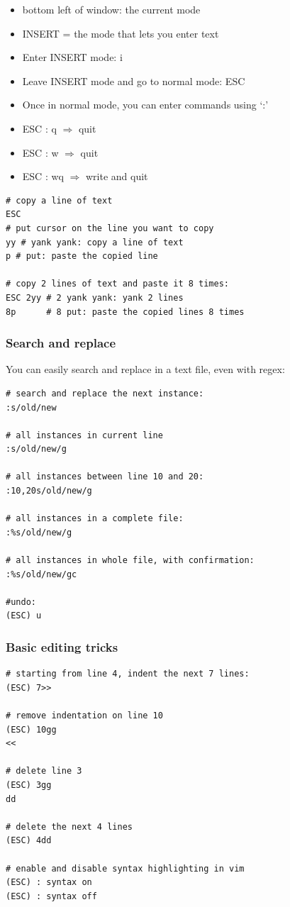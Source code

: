 \documentclass{article}
\begin{document}
\begin{itemize}
    \item bottom left of window: the current mode
    \item INSERT = the mode that lets you enter text
    \item Enter INSERT mode: i
    \item Leave INSERT mode and go to normal mode: ESC
    \item Once in normal mode, you can enter commands using `:'
    \item ESC : q $\Rightarrow$ quit
    \item ESC : w $\Rightarrow$ quit
    \item ESC : wq $\Rightarrow$ write and quit
\end{itemize}

\begin{verbatim}
# copy a line of text
ESC
# put cursor on the line you want to copy
yy # yank yank: copy a line of text
p # put: paste the copied line

# copy 2 lines of text and paste it 8 times:
ESC 2yy # 2 yank yank: yank 2 lines
8p      # 8 put: paste the copied lines 8 times
\end{verbatim}

\subsubsection{Search and replace}

You can easily search and replace in a text file, even with regex:

\begin{verbatim}
# search and replace the next instance:
:s/old/new

# all instances in current line
:s/old/new/g

# all instances between line 10 and 20:
:10,20s/old/new/g

# all instances in a complete file:
:%s/old/new/g

# all instances in whole file, with confirmation:
:%s/old/new/gc

#undo:
(ESC) u
\end{verbatim}

\subsubsection{Basic editing tricks}

\begin{verbatim}
# starting from line 4, indent the next 7 lines:
(ESC) 7>>

# remove indentation on line 10
(ESC) 10gg
<<

# delete line 3
(ESC) 3gg
dd

# delete the next 4 lines
(ESC) 4dd

# enable and disable syntax highlighting in vim
(ESC) : syntax on
(ESC) : syntax off
\end{verbatim}
\end{document}
